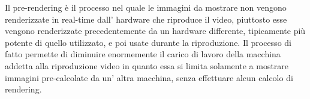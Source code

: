 Il pre-rendering è il processo nel quale le immagini da mostrare non vengono renderizzate in real-time dall’ hardware che riproduce il video, piuttosto esse vengono renderizzate precedentemente da un hardware differente, tipicamente più potente di quello utilizzato, e poi usate durante la riproduzione.
Il processo di fatto permette di diminuire enormemente il carico di lavoro della macchina addetta alla riproduzione video in quanto essa si limita solamente a mostrare immagini pre-calcolate da un’ altra macchina, senza effettuare alcun calcolo di rendering.


